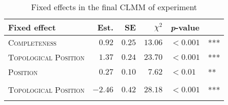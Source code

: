 \begin{table}
\caption{Fixed effects in the final CLMM of experiment }
\centering
\begin{tabular}{lrrrll}
\lsptoprule
Fixed effect & Est. & SE & $\chi^2$ & \textit{p}-value &   \\
\midrule
\textsc{Completeness} & $0.92$ & $0.25$ & $13.06$ & $< 0.001$ & ***\\
\textsc{Topological Position} & $1.37$ & $0.24$ & $23.70$ & $< 0.001$ & ***\\
\textsc{Position} & $0.27$ & $0.10$ & $7.62$ & $< 0.01$ & **\\
\Centerstack[l]{\textsc{Completeness} $\times$ \\ \textsc{Topological Position}} & $-2.46$ & $0.42$ & $28.18$ & $< 0.001$ & ***\\
\lspbottomrule
\end{tabular}
\label{tab:pf.mf.model}
\end{table}

